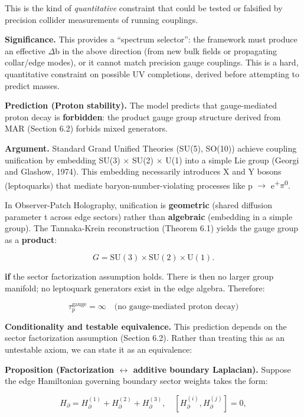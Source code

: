 \documentclass[11pt,a4paper]{article}
\theoremstyle{remark}
\begin{document}
This is the kind of \emph{quantitative} constraint that could be tested or falsified
by precision collider measurements of running couplings.

\textbf{Significance.} This provides a ``spectrum selector'': the framework must
produce an effective \ensuremath{\Delta}b in the above direction (from new bulk fields or
propagating collar/edge modes), or it cannot match precision gauge couplings.
This is a hard, quantitative constraint on possible UV completions, derived
before attempting to predict masses.

\textbf{Prediction (Proton stability).} The model predicts that
gauge-mediated proton decay is \textbf{forbidden}: the product gauge group
structure derived from MAR (Section 6.2) forbids mixed generators.

\textbf{Argument.} Standard Grand Unified Theories (SU(5), SO(10)) achieve
coupling unification by embedding SU(3) \ensuremath{\times} SU(2) \ensuremath{\times} U(1) into a
simple Lie group (Georgi and Glashow, 1974). This embedding necessarily
introduces X and Y bosons (leptoquarks) that mediate baryon-number-violating
processes like p \ensuremath{\to} e\textsuperscript{+}\ensuremath{\pi}\textsuperscript{0}.

In Observer-Patch Holography, unification is \textbf{geometric} (shared diffusion
parameter t across edge sectors) rather than \textbf{algebraic} (embedding in a
simple group). The Tannaka-Krein reconstruction (Theorem 6.1) yields the
gauge group as a \textbf{product}:

\[
G = \mathrm{SU}(3) \times \mathrm{SU}(2) \times \mathrm{U}(1).
\]

\textbf{if} the sector factorization assumption holds. There is then no larger
group manifold; no leptoquark generators exist in the edge algebra.
Therefore:

\[
\tau_p^{\mathrm{gauge}} = \infty \quad \text{(no gauge-mediated proton decay)}
\]

\textbf{Conditionality and testable equivalence.} This prediction depends on the
sector factorization assumption (Section 6.2). Rather than treating this as
an untestable axiom, we can state it as an equivalence:

\textbf{Proposition (Factorization \ensuremath{\leftrightarrow} additive boundary Laplacian).} Suppose the
edge Hamiltonian governing boundary sector weights takes the form:

\[
H_{\partial} = H^{(1)}_{\partial} + H^{(2)}_{\partial} + H^{(3)}_{\partial},
\quad [H^{(i)}_{\partial}, H^{(j)}_{\partial}] = 0,
\]
\end{document}
